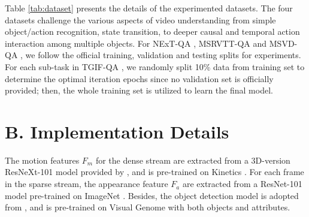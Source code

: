 \documentclass[letterpaper]{article} \usepackage{aaai21}  \usepackage{times}  \usepackage{helvet} \usepackage{courier}  \usepackage[hyphens]{url}  \usepackage{graphicx} \urlstyle{rm} \def\UrlFont{\rm}  \usepackage{natbib}  \usepackage{caption} \usepackage{color, colortbl}
\begin{document}
Table \ref{tab:dataset} presents the details of the experimented datasets. The four datasets challenge the various aspects of video understanding from simple object/action recognition, state transition, to deeper causal and temporal action interaction among multiple objects. For NExT-QA \cite{xiao2021next}, MSRVTT-QA \cite{xu2017video} and MSVD-QA \cite{xu2017video}, we follow the official training, validation and testing splits for experiments. For each sub-task in TGIF-QA \cite{jang2017}, we randomly split 10\% data from training set to determine the optimal iteration epochs since no validation set is officially provided; then, the whole training set is utilized to learn the final model. 

\begin{table*}[t!]
\small
\centering
\begin{threeparttable}
\caption{Model efficiency of HQGA. GPU: Tesla V100. Batch size: 64. M: Minutes per epoch. Time of feature extraction is not considered. The model size varies a bit on open-ended QA datasets as the number of answers (categories) are different.}
\label{tab:model}
\end{threeparttable}
\end{table*}

\section{B. Implementation Details}
The motion features $F_m$ for the dense stream are extracted from a 3D-version ResNeXt-101 model provided by \cite{hara2018can}, and is pre-trained on Kinetics \cite{kay2017kinetics}. For each frame in the sparse stream, the appearance feature $F_a$ are extracted from a ResNet-101 \cite{he2016deep} model pre-trained on ImageNet \cite{deng2009imagenet}. Besides, the object detection model is adopted from \cite{anderson2018bottom}, and is pre-trained on Visual Genome \cite{krishna2017visual} with both objects and attributes. 
\end{document}
